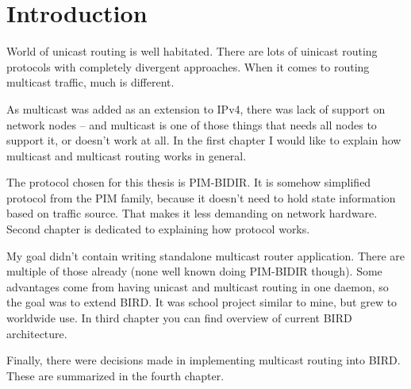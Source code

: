 \chapter*{Introduction}

World of unicast routing is well habitated. There are lots of uinicast routing
protocols with completely divergent approaches. When it comes to routing
multicast traffic, much is different.

As multicast was added as an extension to IPv4, there was lack of support on
network nodes -- and multicast is one of those things that needs all nodes to
support it, or doesn't work at all. In the first chapter I would like to %
explain how multicast and multicast routing works in general.

The protocol chosen for this thesis is PIM-BIDIR. It is somehow simplified
protocol from the PIM family, because it doesn't need to hold state information
based on traffic source. That makes it less demanding on network hardware.
Second chapter is dedicated to explaining how protocol works. %

My goal didn't contain writing standalone multicast router application. There
are multiple of those already (none well known doing PIM-BIDIR though). Some
advantages come from having unicast and multicast routing in one daemon, so the
goal was to extend BIRD. It was school project similar to mine, but grew to
worldwide use. In third chapter you can find overview of current BIRD %
architecture.

Finally, there were decisions made in implementing multicast routing into BIRD.
These are summarized in the fourth chapter.


